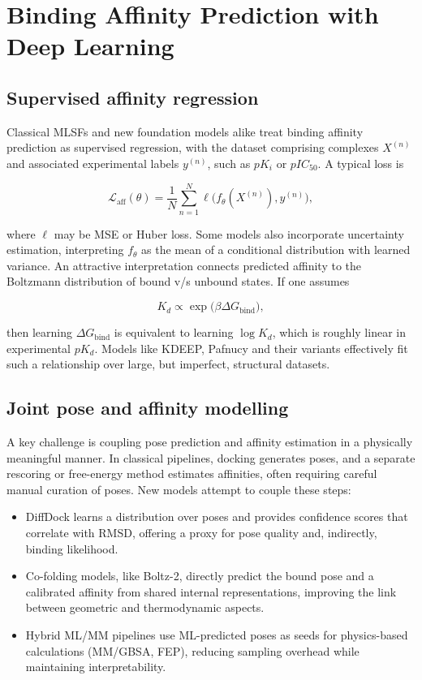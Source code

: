 \documentclass[12pt]{article}
\begin{document}
\section{Binding Affinity Prediction with Deep Learning}

\subsection{Supervised affinity regression}

Classical MLSFs and new foundation models alike treat binding affinity prediction as supervised regression, with the dataset comprising complexes $X^{(n)}$ and associated experimental labels $y^{(n)}$, such as $pK_i$ or $pIC_{50}$. A typical loss is

\begin{equation}
\mathcal{L}_{\text{aff}}(\theta) = \frac{1}{N} \sum_{n=1}^{N} \ell\big(f_{\theta}(X^{(n)}), y^{(n)}\big),
\end{equation}

where $\ell$ may be MSE or Huber loss. Some models also incorporate uncertainty estimation, interpreting $f_{\theta}$ as the mean of a conditional distribution with learned variance. An attractive interpretation connects predicted affinity to the Boltzmann distribution of bound v/s unbound states. If one assumes

\begin{equation}
K_d \propto \exp\big(\beta \Delta G_{\text{bind}}\big),
\end{equation}

then learning $\Delta G_{\text{bind}}$ is equivalent to learning $\log K_d$, which is roughly linear in experimental $pK_d$. Models like KDEEP\cite{CH13_jimenez2018k}, Pafnucy\cite{CH13_stepniewska2018development} and their variants effectively fit such a relationship over large, but imperfect, structural datasets.

\subsection{Joint pose and affinity modelling}

A key challenge is coupling pose prediction and affinity estimation in a physically meaningful manner. In classical pipelines, docking generates poses, and a separate rescoring or free-energy method estimates affinities, often requiring careful manual curation of poses. New models attempt to couple these steps:
\begin{itemize}
  \item DiffDock learns a distribution over poses and provides confidence scores that correlate with RMSD, offering a proxy for pose quality and, indirectly, binding likelihood.
  \item Co-folding models, like Boltz-2\cite{CH13_passaro2025boltz2}, directly predict the bound pose and a calibrated affinity from shared internal representations, improving the link between geometric and thermodynamic aspects.
  \item Hybrid ML/MM pipelines use ML-predicted poses as seeds for physics-based calculations (MM/GBSA, FEP), reducing sampling overhead while maintaining interpretability.
\end{itemize}
\end{document}
